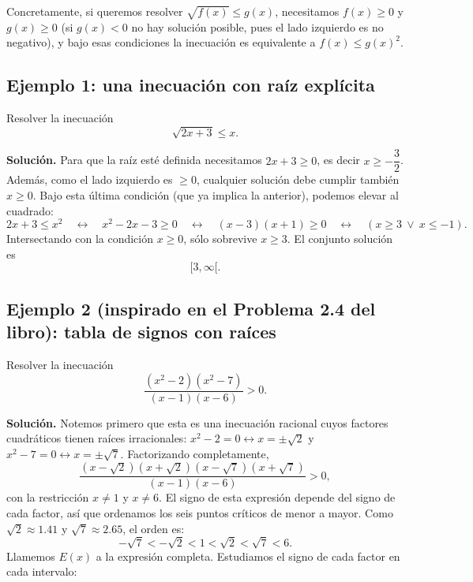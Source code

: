 \documentclass[11pt]{article}
\begin{document}
Concretamente, si queremos resolver $\sqrt{f(x)} \le g(x)$, necesitamos $f(x) \ge 0$ y $g(x) \ge 0$
(si $g(x) < 0$ no hay solución posible, pues el lado izquierdo es no negativo), y bajo esas
condiciones la inecuación es equivalente a $f(x) \le g(x)^2$.

\subsection*{Ejemplo 1: una inecuación con raíz explícita}

Resolver la inecuación
\[
\sqrt{2x+3} \le x.
\]

\textbf{Solución.} Para que la raíz esté definida necesitamos $2x+3 \ge 0$, es decir
$x \ge -\dfrac{3}{2}$. Además, como el lado izquierdo es $\ge 0$, cualquier solución debe cumplir
también $x \ge 0$. Bajo esta última condición (que ya implica la anterior), podemos elevar al
cuadrado:
\[
2x + 3 \le x^2 \quad \leftrightarrow \quad x^2 - 2x - 3 \ge 0 \quad \leftrightarrow \quad
(x-3)(x+1) \ge 0 \quad \leftrightarrow \quad (x \ge 3 \ \lor\ x \le -1).
\]
Intersectando con la condición $x \ge 0$, sólo sobrevive $x \ge 3$. El conjunto solución es
\[
[3, \infty[.
\]

\subsection*{Ejemplo 2 (inspirado en el Problema 2.4 del libro): tabla de signos con raíces}

Resolver la inecuación
\[
\frac{(x^2-2)(x^2-7)}{(x-1)(x-6)} > 0.
\]

\textbf{Solución.} Notemos primero que esta es una inecuación racional cuyos factores cuadráticos
tienen raíces irracionales: $x^2 - 2 = 0 \leftrightarrow x = \pm\sqrt{2}$ y
$x^2 - 7 = 0 \leftrightarrow x = \pm\sqrt{7}$. Factorizando completamente,
\[
\frac{(x-\sqrt{2})(x+\sqrt{2})(x-\sqrt{7})(x+\sqrt{7})}{(x-1)(x-6)} > 0,
\]
con la restricción $x \neq 1$ y $x \neq 6$. El signo de esta expresión depende del signo de cada
factor, así que ordenamos los seis puntos críticos de menor a mayor. Como
$\sqrt{2} \approx 1.41$ y $\sqrt{7}\approx 2.65$, el orden es:
\[
-\sqrt{7} < -\sqrt{2} < 1 < \sqrt{2} < \sqrt{7} < 6.
\]
Llamemos $E(x)$ a la expresión completa. Estudiamos el signo de cada factor en cada intervalo:
\end{document}
